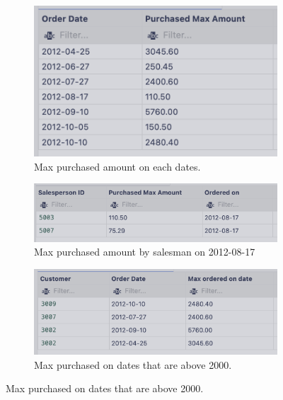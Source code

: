 \begin{figure}[H]
    \begin{subfigure}{.5\textwidth}
        \centering
        \includegraphics[width=.8\linewidth]{images/output/q5.png}
        \caption*{Max purchased amount on each dates.}
        \label{fig:q5}
    \end{subfigure}
    \begin{subfigure}{.5\textwidth}
        \centering
        \includegraphics[width=.8\linewidth]{images/output/q6.png}
        \caption*{Max purchased amount by salesman on 2012-08-17}
        \label{fig:q6}
    \end{subfigure}
    \begin{subfigure}{1\textwidth}
        \centering
        \includegraphics[width=.6\linewidth]{images/output/q7.png}
        \caption*{Max purchased on dates that are above 2000.}
        \label{fig:q7}
    \end{subfigure}
    \label{fig:expo}
\end{figure}